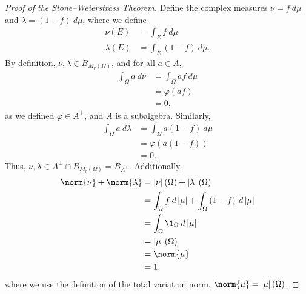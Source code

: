 \documentclass[10pt]{mypackage}
\begin{document}
\begin{proof}[Proof of the Stone--Weierstrass Theorem]
  Define the complex measures $\nu = f\:d\mu$ and $\lambda = \left( 1-f \right)\:d\mu$, where we define
  \begin{align*}
    \nu\left( E \right) &= \int_{E}^{} f\:d\mu\\
    \lambda(E) &= \int_{E}^{} \left( 1-f \right)\:d\mu.
  \end{align*}
  By definition, $\nu,\lambda\in B_{M_r\left( \Omega \right)}$, and for all $a\in A$,
  \begin{align*}
    \int_{\Omega}^{} a\:d\nu &= \int_{\Omega}^{} a f\:d\mu\\
                             &= \varphi\left( af \right)\\
                             &= 0,
  \end{align*}
  as we defined $\varphi\in A^{\perp}$, and $A$ is a subalgebra. Similarly,
  \begin{align*}
    \int_{\Omega}^{} a\:d\lambda &= \int_{\Omega}^{} a\left( 1-f \right)\:d\mu\\
                                 &= \varphi\left( a\left( 1-f \right) \right)\\
                                 &= 0.
  \end{align*}
  Thus, $\nu,\lambda\in A^{\perp}\cap B_{M_r\left( \Omega \right)}=B_{A^{\perp}}$. Additionally,
  \begin{align*}
    \norm{\nu} + \norm{\lambda} &= \left\vert \nu \right\vert\left( \Omega \right) + \left\vert \lambda \right\vert\left( \Omega \right)\\
                                &= \int_{\Omega}^{} f\:d\left\vert \mu \right\vert + \int_{\Omega}^{} \left( 1-f \right)\:d\left\vert \mu \right\vert\\
                                &= \int_{\Omega}^{} \1_{\Omega}\:d\left\vert \mu \right\vert\\
                                &= \left\vert \mu \right\vert\left( \Omega \right)\\
                                &= \norm{\mu}\\
                                &= 1,
  \end{align*}
  where we use the definition of the total variation norm, $\norm{\mu} = \left\vert \mu \right\vert\left( \Omega \right)$.\newline


\end{proof}
\end{document}
